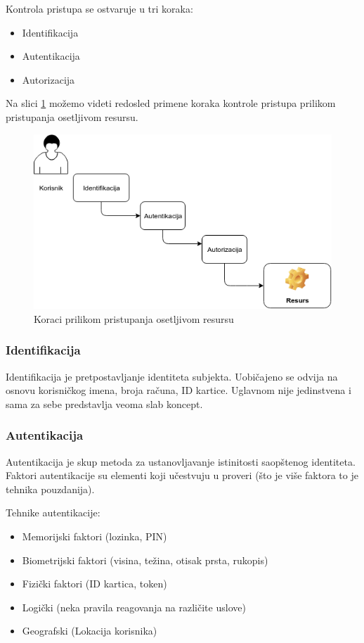 \documentclass[a4paper]{article}
\begin{document}
Kontrola pristupa se ostvaruje u tri koraka:
\begin{itemize}
	\item Identifikacija
	\item Autentikacija
	\item Autorizacija
\end{itemize}
Na slici \ref{slika1} možemo videti redosled primene koraka kontrole pristupa prilikom pristupanja osetljivom resursu.

\begin{figure}[h]
\begin{center}
\includegraphics[scale=0.4]{koraci}
\caption{Koraci prilikom pristupanja osetljivom resursu}
\label{slika1}
\end{center}
\end{figure}

\subsubsection{Identifikacija}
Identifikacija je pretpostavljanje identiteta subjekta. Uobičajeno se odvija na osnovu korisničkog imena, broja računa, ID kartice. Uglavnom nije jedinstvena i sama za sebe predstavlja veoma slab koncept.

\subsubsection{Autentikacija}
Autentikacija je skup metoda za ustanovljavanje istinitosti saopštenog identiteta. Faktori autentikacije su elementi koji učestvuju u proveri (što je više faktora to je tehnika pouzdanija).

Tehnike autentikacije: 
    \begin{itemize}
        \item Memorijski faktori (lozinka, PIN)
        \item  Biometrijski faktori (visina, težina, otisak prsta, rukopis)
        \item Fizički faktori (ID kartica, token)
        \item Logički (neka pravila reagovanja na različite uslove)                                    
        \item Geografski (Lokacija korisnika)                                
    \end{itemize}
\end{document}
